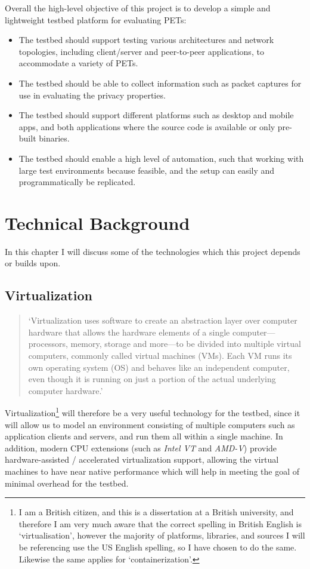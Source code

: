 \documentclass[
    author={Jacob Daniel Halsey},
    supervisor={Prof. Awais Rashid},
    degree={BSc},
    title={Building a Testbed for Evaluating Privacy Enhancing Technologies  (PETs)},
    subtitle={},
    type={software development},
    year={2021}
]{dissertation}
\begin{document}
Overall the high-level objective of this project is to develop a simple and lightweight
testbed platform for evaluating PETs:

\begin{itemize}
	\item The testbed should support testing various architectures and network topologies, 
	including client/server and peer-to-peer applications, to accommodate a variety of PETs.
	\item The testbed should be able to collect information such as packet captures
	for use in evaluating the privacy properties.
	\item The testbed should support different platforms such as desktop and mobile apps,
	and both applications where the source code is available or only pre-built binaries.
	\item The testbed should enable a high level of automation, such that working with large test
	environments because feasible, and the setup can easily and programmatically be replicated.
\end{itemize}

\chapter{Technical Background}
\label{chap:technical}

In this chapter I will discuss some of the technologies which this project depends or builds upon.

\section{Virtualization}

\begin{quotation}
	`Virtualization uses software to create an abstraction layer over computer hardware that allows the hardware 
	elements of a single computer—processors, memory, storage and more—to be divided into multiple virtual computers, 
	commonly called virtual machines (VMs). Each VM runs its own operating system (OS) and behaves like an independent 
	computer, even though it is running on just a portion of the actual underlying computer hardware.'~\cite{ibm_virtualization}
\end{quotation}

Virtualization\footnote{I am a British citizen, and this is a dissertation at a British university, 
and therefore I am very much aware that the correct spelling in British English is `virtualisation', however the
majority of platforms, libraries, and sources I will be referencing use the US English spelling, 
so I have chosen to do the same. Likewise the same applies for `containerization'.}
 will therefore be a very useful technology for the testbed, since it will allow us to model
an environment consisting of multiple computers such as application clients and servers, and run
them all within a single machine. In addition, modern CPU extensions (such as \emph{Intel VT} and \emph{AMD-V}) 
provide hardware-assisted / accelerated virtualization support, allowing the virtual machines to 
have near native performance which will help in meeting the goal of minimal overhead for the testbed. \\
\end{document}
